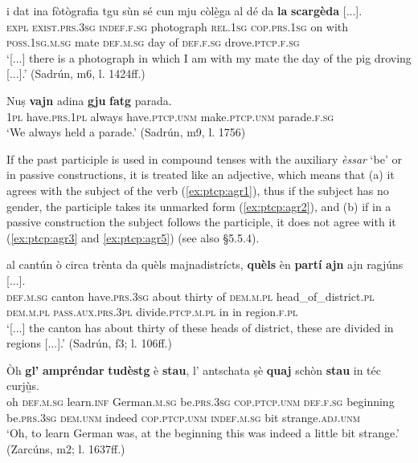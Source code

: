 \ea\label{ex:ptcp4}
\gll [...] i dat ina fòtògrafia tgu sùn sé cun mju còlè̱ga al dé da \textbf{la} \textbf{scargèda} [...].\\
{} \textsc{expl} \textsc{exist.prs.3sg}  \textsc{indef.f.sg} photograph \textsc{rel.1sg}  \textsc{cop.prs.1sg} on with  \textsc{poss.1sg.m.sg} mate \textsc{def.m.sg} day of \textsc{def.f.sg}  drove.\textsc{ptcp.f.sg} \\
\glt `[...] there is a photograph in which I am with my mate the day of the pig droving [...].' (Sadrún, m6, l. 1424ff.)
\z

\ea
\label{ex:dcomp:3}
\gll Nuṣ \textbf{vajn} adina \textbf{gju} \textbf{fatg} parada.   \\
\textsc{1pl} have.\textsc{prs.1pl} always have.\textsc{ptcp.unm} make.\textsc{ptcp.unm} parade.\textsc{f.sg}\\
\glt `We always held a parade.' (Sadrún, m9, l. 1756)
\z

If the past participle is used in compound tenses with the auxiliary \textit{èssar} `be' or in passive constructions, it is treated like an adjective, which means that (a) it agrees with the subject of the verb (\ref{ex:ptcp:agr1}), thus if the subject has no gender, the participle  takes its unmarked form (\ref{ex:ptcp:agr2}), and (b) if in a passive construction the subject follows the participle, it does not agree with it (\ref{ex:ptcp:agr3} and \ref{ex:ptcp:agr5}) (see also §5.5.4).

\ea\label{ex:ptcp:agr1}
\gll [...] al cantún ò circa trènta da quèls majnadistrícts, \textbf{quèls} èn \textbf{partí} \textbf{ajn}\footnotemark{} ajn ragjúns [...].  \\
{} \textsc{def.m.sg} canton  have.\textsc{prs.3sg} about thirty of \textsc{dem.m.pl} head\_of\_district.\textsc{pl} \textsc{dem.m.pl} \textsc{pass.aux.prs.3pl} divide.\textsc{ptcp.m.pl} in in region.\textsc{f.pl}\\
\glt `[...] the canton has about thirty of these heads of district, these are divided in regions [...].' (Sadrún, f3; l. 106ff.)
\z

\ea\label{ex:ptcp:agr2}
\gll    Òh \textbf{gl’} \textbf{ampréndar} \textbf{tudèstg} è \textbf{stau}, l’ antschata ṣè \textbf{quaj} schòn \textbf{stau} in téc curjù̱s.\\
oh \textsc{def.m.sg} learn.\textsc{inf} German.\textsc{m.sg} be.\textsc{prs.3sg}  \textsc{cop.ptcp.unm} \textsc{def.f.sg} beginning be.\textsc{prs.3sg} \textsc{dem.unm} indeed \textsc{cop.ptcp.unm} \textsc{indef.m.sg} bit strange.\textsc{adj.unm}\\
\glt `Oh, to learn German was, at the beginning this was indeed a little bit strange.' (Zarcúns, m2; l. 1637ff.)
\z

